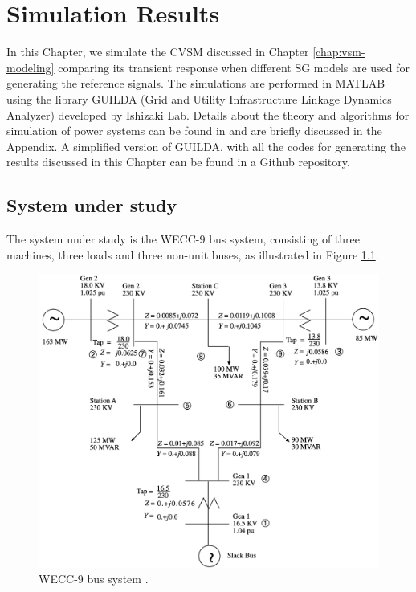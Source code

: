 \chapter{Simulation Results}

In this Chapter, we simulate the CVSM discussed in Chapter
\ref{chap:vsm-modeling} comparing its transient response when different SG
models are used for generating the reference signals. The simulations are
performed in MATLAB using the library GUILDA (Grid and Utility Infrastructure
Linkage Dynamics Analyzer) developed by Ishizaki Lab. Details about the theory
and algorithms for simulation of power systems can be found in
\cite{sauer2017power,ishizaki2020} and are briefly discussed in the Appendix. A simplified
version of GUILDA, with all the codes for generating the results discussed in
this Chapter can be found in a Github repository. 

\section{System under study}

The system under study is the WECC-9 bus system, consisting of three machines,
three loads and three non-unit buses, as illustrated in Figure \ref{fig:WSCC9}.

\begin{figure}[ht!]
    \centering
    \includegraphics[width = 12cm]{images/WSCC9.png}
    \caption{WECC-9 bus system \cite{sauer2017power}.}
    \label{fig:WSCC9}
\end{figure}

